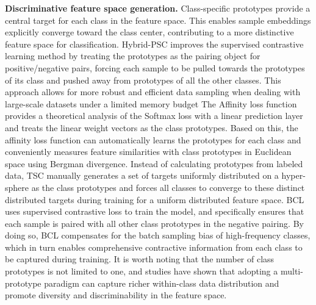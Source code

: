 \textbf{Discriminative feature space generation.}
Class-specific prototypes provide a central target for each class in the feature space. This enables sample embeddings explicitly converge toward the class center, contributing to a more distinctive feature space for classification. 
Hybrid-PSC \cite{wang2021contrastive} improves the supervised contrastive learning method by treating the prototypes as the pairing object for positive/negative pairs, forcing each sample to be pulled towards the prototypes of its class and pushed away from prototypes of all the other classes. This approach allows for more robust and efficient data sampling when dealing with large-scale datasets under a limited memory budget 
The Affinity loss function \cite{hayat2019gaussian} provides a theoretical analysis of the Softmax loss with a linear prediction layer and treats the linear weight vectors as the class prototypes. Based on this, the affinity loss function can automatically learns the prototypes for each class and conveniently measures feature similarities with class prototypes in Euclidean space using Bergman divergence.
Instead of calculating prototypes from labeled data, TSC \cite{li2022targeted} manually generates a set of targets uniformly distributed on a hyper-sphere as the class prototypes and forces all classes to converge to these distinct distributed targets during training for a uniform distributed feature space.
BCL \cite{zhu2022balanced} uses supervised contrastive loss to train the model, and specifically ensures that each sample is paired with all other class prototypes in the negative pairing. By doing so, BCL compensates for the batch sampling bias of high-frequency classes, which in turn enables comprehensive contractive information from each class to be captured during training.
It is worth noting that the number of class prototypes is not limited to one, and studies \cite{wang2021contrastive, hayat2019gaussian} have shown that adopting a multi-prototype paradigm can capture richer within-class data distribution and promote diversity and discriminability in the feature space.

